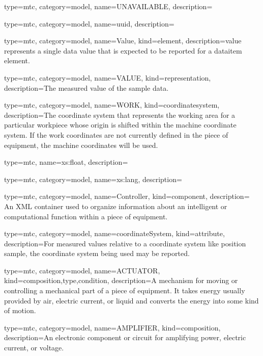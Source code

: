 {
  type=mtc,
  category=model,
  name={UNAVAILABLE},
  description={}
}


{
  type=mtc,
  category=model,
  name={uuid},
  description={}
}



{
  type=mtc,
  category=model,
  name={Value},
  kind={element},
  description={\gls{value} represents a single data value that is expected to be reported for a \gls{dataitem} element. }
}


{
  type=mtc,
  category=model,
  name={VALUE},
  kind={representation},
  description={The measured value of the sample data.}
}


{
  type=mtc,
  category=model,
  name={WORK},
  kind={coordinatesystem},
  description={The coordinate system that represents the working area for a particular workpiece whose origin is shifted within the \gls{machine} coordinate system. If the \gls{work} coordinates are not currently defined in the piece of equipment, the \gls{machine} coordinates will be used.}
}


{
  type=mtc,
  name={xs:float},
  description={}
}


{
  type=mtc,
  category=model,
  name={xs:lang},
  description={}
}


{
  type=mtc,
  category=model,
  name={Controller},
  kind={component},
  description= {An XML container used to organize information about an intelligent or computational function within a piece of equipment.}
}


{
  type=mtc,
  category=model,
  name={coordinateSystem},
  kind={attribute},
  description={For measured values relative to a coordinate system like \gls{position sample}, the coordinate system being used may be reported.}
}


{
  type=mtc,
  category=model,
  name={ACTUATOR},
  kind={composition,type,condition},
  description={A mechanism for moving or controlling a mechanical part of a piece of equipment.   \newline It takes energy usually provided by air, electric current, or liquid and converts the energy into some kind of motion. }
}


{
  type=mtc,
  category=model,
  name={AMPLIFIER},
  kind={composition},
  description={An electronic component or circuit for amplifying power, electric current, or voltage.}
}


